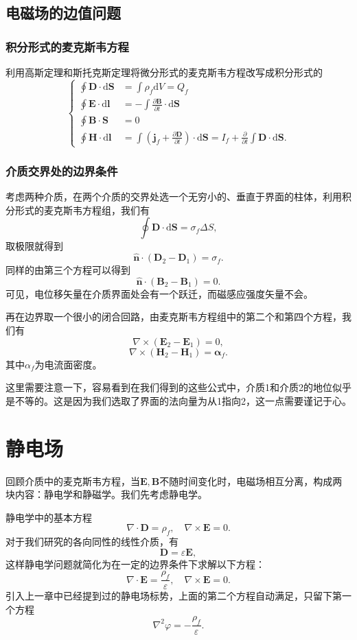 \documentclass[UTF8]{ctexbook}
\renewcommand{\d}{\mathrm{d}}
\renewcommand{\b}{\boldsymbol}
\numberwithin{equation}{chapter}
\begin{document}
	\section{电磁场的边值问题}
	\subsection{积分形式的麦克斯韦方程}
	利用高斯定理和斯托克斯定理将微分形式的麦克斯韦方程改写成积分形式的
	\[\left\{\begin{aligned}
		\oint\b{D}\cdot\d\b{S}&=\int \rho_f \d V=Q_f \\
		\oint\b{E}\cdot\d\b{l}&=-\int \frac{\partial \b{B}}{\partial t}\cdot\d\b{S} \\
		\oint \b{B}\cdot\b{S}&=0 \\
		\oint \b{H}\cdot\d\b{l}&=\int \left(\b{j}_f +\frac{\partial \b{D}}{\partial t}\right)\cdot\d\b{S}=I_f+\frac{\partial }{\partial t}\int \b{D}\cdot\d\b{S}.	
	\end{aligned}\right.\]
	
	\subsection{介质交界处的边界条件}
	考虑两种介质，在两个介质的交界处选一个无穷小的、垂直于界面的柱体，利用积分形式的麦克斯韦方程组，我们有
	\[\oint \b{D}\cdot\d\b{S}=\sigma_f \Delta S,\]
	取极限就得到
	\[\hat{\b{n}}\cdot(\b{D}_2-\b{D}_1)=\sigma_f.\]
	同样的由第三个方程可以得到
	\[\hat{\b{n}}\cdot(\b{B}_2-\b{B}_1)=0.\]
	可见，电位移矢量在介质界面处会有一个跃迁，而磁感应强度矢量不会。
	
	再在边界取一个很小的闭合回路，由麦克斯韦方程组中的第二个和第四个方程，我们有
	\[\nabla\times(\b{E}_2-\b{E}_1)=0,\]
	\[\nabla\times(\b{H}_2-\b{H}_1)=\b{\alpha}_f.\]
	其中$\alpha_f$为电流面密度。
	
	这里需要注意一下，容易看到在我们得到的这些公式中，介质1和介质2的地位似乎是不等的。这是因为我们选取了界面的法向量为从1指向2，这一点需要谨记于心。
	
	
	
	\chapter{静电场}
	回顾介质中的麦克斯韦方程，当$\b{E},\b{B}$不随时间变化时，电磁场相互分离，构成两块内容：静电学和静磁学。我们先考虑静电学。
	
	静电学中的基本方程
	\[\nabla\cdot\b{D}=\rho_f,\quad \nabla\times\b{E}=0.\]
	对于我们研究的各向同性的线性介质，有
	\[\b{D}=\varepsilon \b{E},\]
	这样静电学问题就简化为在一定的边界条件下求解以下方程：
	\[\nabla\cdot\b{E}=\frac{\rho_f}{\varepsilon},\quad \nabla\times\b{E}=0.\]
	引入上一章中已经提到过的静电场标势，上面的第二个方程自动满足，只留下第一个方程
	\[\nabla^2 \varphi=-\frac{\rho_f}{\varepsilon}.\]
	
\end{document}
